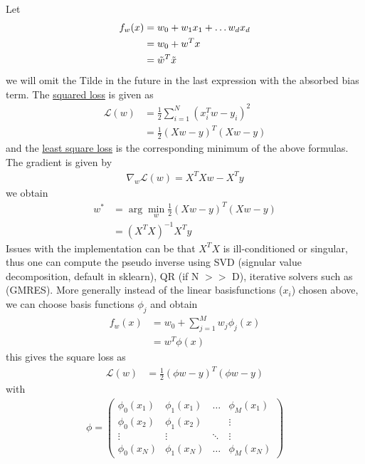 \documentclass[12 pt]{article}        	%
\begin{document}
Let 
\begin{align*}
    f_w ( x ) 
    &=
    w_0 + w_1 x_1 + \dotsc w_d x_d
    \\
    &=
    w_0 + w^T x
    \\
    &=
    \Tilde{ w }^T \Tilde{ x }
\end{align*}
we will omit the Tilde in the future in the last expression with the absorbed bias
term.
The \underline{squared loss} is given as 
\begin{align*}
    \mathcal{ L } ( w ) &= \frac{ 1 }{ 2 } \sum_{ i = 1 }^N ( x_i^T w - y_i )^2 
    \\
    &= 
    \frac{ 1 }{ 2 } ( X w - y )^T ( X w - y ) 
\end{align*}
and the \underline{least square loss} is the corresponding minimum of the above formulas.
The gradient is given by 
\begin{align*}
    \nabla_w \mathcal{ L } ( w ) 
    =
    X^T X w - X^T y
\end{align*}
we obtain   
\begin{align*}
    w^* 
    &=
    \arg \min_w \frac{ 1 }{ 2 } ( X w - y )^T ( X w - y ) 
    \\
    &=
    ( X^T X )^{ - 1 } X^T y 
\end{align*}
Issues with the implementation can be that $ X^T X $ is ill-conditioned or singular, thus one can compute the pseudo inverse using SVD (signular value decomposition, default in sklearn), QR (if N $>>$ D), iterative solvers such as (GMRES).
More generally instead of the linear basisfunctions ($x_i$) chosen above, we can choose basis functions $ \phi_j $
and obtain 
\begin{align*}
    f_w ( x ) 
    &=
    w_0 + \sum_{ j = 1 }^M w_j \phi_j ( x ) 
    \\
    &=
    w^T \phi ( x ) 
\end{align*}
this gives the square loss as 
\begin{align*}
    \mathcal{ L } ( w ) 
    &=
    \frac{ 1 }{ 2 }
    ( \phi w - y )^T ( \phi w - y ) 
\end{align*}
with
\begin{align*}
    \phi 
    = 
    \begin{pmatrix}
        \phi_0 ( x_1 ) 
        &
        \phi_1 ( x_1 ) 
        &
        \dotsc 
        &
        \phi_M ( x_1 ) 
        \\
        \phi_0 ( x_2 )
        &
        \phi_1 ( x_2 ) 
        &
        &
        \vdots
        \\
        \vdots 
        &
        \vdots 
        &
        \ddots
        &
        \vdots
        \\
        \phi_0 ( x_N ) 
        &
        \phi_1 ( x_N ) 
        &
        \dots 
        &
        \phi_M ( x_N ) 
    \end{pmatrix}
\end{align*}
\end{document}
